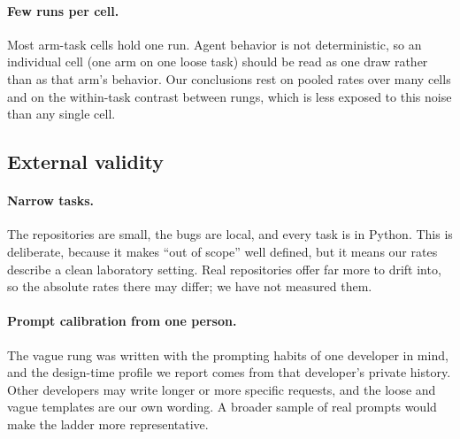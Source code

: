 \paragraph{Few runs per cell.} Most arm-task cells hold one run. Agent
behavior is not deterministic, so an individual cell (one arm on one loose
task) should be read as one draw rather than as that arm's behavior. Our
conclusions rest on pooled rates over many cells and on the within-task
contrast between rungs, which is less exposed to this noise than any single
cell.

\subsection{External validity}

\paragraph{Narrow tasks.} The repositories are small, the bugs are local, and
every task is in Python. This is deliberate, because it makes ``out of scope''
well defined, but it means our rates describe a clean laboratory setting.
Real repositories offer far more to drift into, so the absolute rates there
may differ; we have not measured them.

\paragraph{Prompt calibration from one person.} The vague rung was written with
the prompting habits of one developer in mind, and the design-time profile we
report comes from that developer's private history. Other developers may write longer or
more specific requests, and the loose and vague templates are our own
wording. A broader sample of real prompts would make the ladder more
representative.

